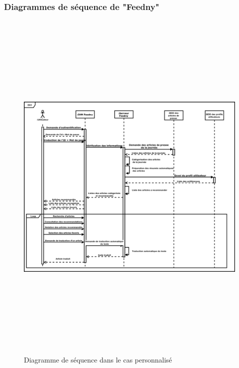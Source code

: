 \subsubsection{Diagrammes de séquence de "Feedny"}
\begin{figure}[H]
	\centering
	\includegraphics[height=500pt,width=425pt]{img/chapter3/diagseqperso.png}
	\caption{Diagramme de séquence dans le cas personnalisé}
\end{figure}


